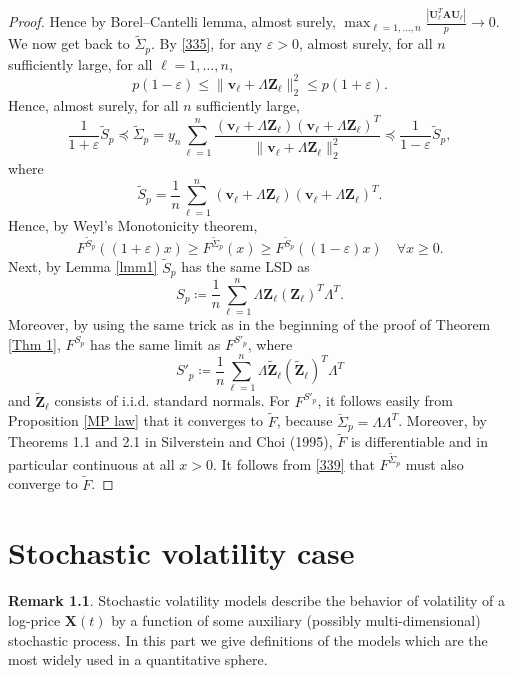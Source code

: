 \documentclass[a4paper,11pt]{book}
\theoremstyle{plain}
\theoremstyle{definition}
\newtheorem{rmrk}[thm]{Remark}
\begin{document}
\begin{proof}
    	 Hence by Borel–Cantelli lemma, almost surely, $\max_{\ell = 1, \dots, n} \frac{| \mathbf{U}_\ell^T \mathbf{A} \mathbf{U}_\ell |}{p} \rightarrow 0$.
    	 We now get back to $\widetilde{\Sigma}_p$. By \eqref{335}, for any $\varepsilon > 0$, almost surely, for all $n$ sufficiently large, for all $\ell = 1, \dots, n$,
    	 \[ p(1-\varepsilon) \leq \| \mathbf{v}_\ell + \Lambda \mathbf{Z}_\ell \|_2^2 \leq p(1+\varepsilon). \]
    	 Hence, almost surely, for all $n$ sufficiently large,
    	 \[ \frac{1}{1+\varepsilon} \widetilde{S}_p \preceq \widetilde{\Sigma}_p = y_n \sum_{\ell=1}^{n} \frac{(\mathbf{v}_\ell + \Lambda \mathbf{Z}_\ell) (\mathbf{v}_\ell + \Lambda \mathbf{Z}_\ell)^T}{\|\mathbf{v}_\ell + \Lambda \mathbf{Z}_\ell\|_2^2} \preceq \frac{1}{1-\varepsilon} \widetilde{S}_p, \]
    	 where
    	 \[  \widetilde{S}_p = \frac{1}{n}\sum_{\ell=1}^{n} (\mathbf{v}_\ell + \Lambda \mathbf{Z}_\ell) (\mathbf{v}_\ell + \Lambda \mathbf{Z}_\ell)^T. \]
    	 Hence, by Weyl's Monotonicity theorem,
    	 \begin{equation} \label{339}
    	     F^{\widetilde{S}_p}((1+\varepsilon)x) \geq F^{\widetilde{\Sigma}_p}(x) \geq F^{\widetilde{S}_p}((1-\varepsilon)x) \quad \forall x \geq 0.
    	 \end{equation}
    	 Next, by Lemma \ref{lmm1} $\widetilde{S}_p$ has the same LSD as 
    	 \[S_p \coloneqq \frac{1}{n} \sum_{\ell=1}^{n} \Lambda \mathbf{Z}_\ell (\mathbf{Z}_\ell)^T \Lambda^T.\]
    	 Moreover, by using the same trick as in the beginning of the proof of Theorem \ref{Thm 1}, $F^{S_p}$ has the same limit as $F^{S'_p}$, where
    	 \[S'_p \coloneqq \frac{1}{n} \sum_{\ell=1}^{n} \Lambda \widetilde{\mathbf{Z}}_\ell (\widetilde{\mathbf{Z}}_\ell)^T \Lambda^T\]
    	 and $\widetilde{\mathbf{Z}}_\ell$ consists of i.i.d. standard normals. For $F^{S'_p}$, it follows easily from Proposition \ref{MP law} that it converges to $\widetilde{F}$, because $\breve{\Sigma}_p = \Lambda \Lambda^T$. Moreover, by Theorems 1.1 and 2.1 in Silverstein and Choi (1995), $\widetilde{F}$ is differentiable and in particular continuous at all $x > 0$. It follows from \eqref{339} that $F^{\widetilde{\Sigma}_p}$ must also converge to $\widetilde{F}$.
    \end{proof}
    
    
    \chapter{Stochastic volatility case}
    \begin{rmrk}
    	Stochastic volatility models describe the behavior of volatility of a log-price $\mathbf{X}(t)$ by a function of some auxiliary (possibly multi-dimensional) stochastic process. In this part we give definitions of the models which are the most widely used in a quantitative sphere.
    \end{rmrk}
    
\end{document}
